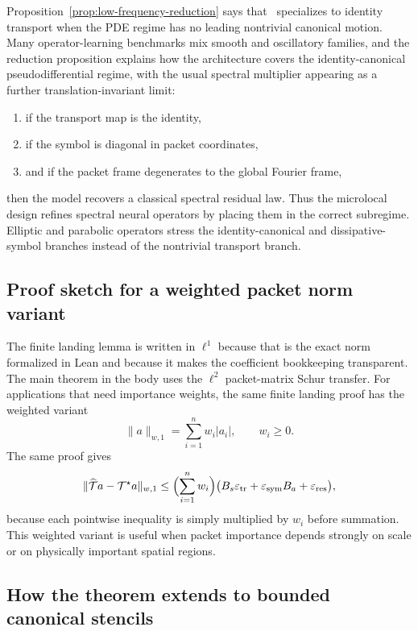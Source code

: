 Proposition~\ref{prop:low-frequency-reduction} says that \MiNO\ specializes to identity transport when the PDE regime has no leading nontrivial canonical motion. Many operator-learning benchmarks mix smooth and oscillatory families, and the reduction proposition explains how the architecture covers the identity-canonical pseudodifferential regime, with the usual spectral multiplier appearing as a further translation-invariant limit:
\begin{enumerate}
\item if the transport map is the identity,
\item if the symbol is diagonal in packet coordinates,
\item and if the packet frame degenerates to the global Fourier frame,
\end{enumerate}
then the model recovers a classical spectral residual law. Thus the microlocal design refines spectral neural operators by placing them in the correct subregime. Elliptic and parabolic operators stress the identity-canonical and dissipative-symbol branches instead of the nontrivial transport branch.

\subsection{Proof sketch for a weighted packet norm variant}

The finite landing lemma is written in $\ell^1$ because that is the exact norm formalized in Lean and because it makes the coefficient bookkeeping transparent.  The main theorem in the body uses the $\ell^2$ packet-matrix Schur transfer.  For applications that need importance weights, the same finite landing proof has the weighted variant
\[
\|a\|_{w,1}=\sum_{i=1}^n w_i |a_i|,
\qquad w_i\ge 0.
\]
The same proof gives
\[
\|\widehat{\mathcal T}a-\mathcal T^\star a\|_{w,1}
\le
\Bigl(\sum_{i=1}^n w_i\Bigr)
\bigl(B_s\varepsilon_{\mathrm{tr}}+\varepsilon_{\mathrm{sym}}B_a+\varepsilon_{\mathrm{res}}\bigr),
\]
because each pointwise inequality is simply multiplied by $w_i$ before summation. This weighted variant is useful when packet importance depends strongly on scale or on physically important spatial regions.

\subsection{How the theorem extends to bounded canonical stencils}

